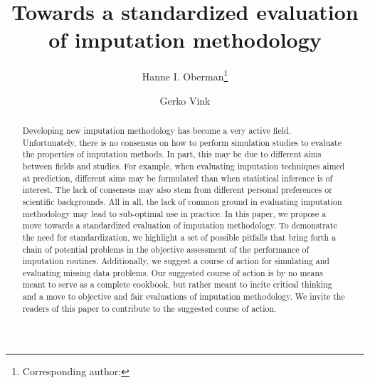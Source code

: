 \documentclass[bimj,fleqn]{w-art}
\begin{document}
\keywords{Evaluation; Imputation; Missing data; Simulation studies;\\ [1pc]
\noindent \hspace*{-4pc} Supporting Information for this article is available from \underline{www.gerkovink.com/evaluation}.\\
}  %

\title[Towards a standardized evaluation of imputation methodology]{Towards a standardized evaluation of imputation methodology}
\author[Oberman]{Hanne I. Oberman\footnote{Corresponding author: {}}} 
\address[\inst{1}]{Departement of Methodology \& Statistics, Padualaan 14, 3584 CH Utrecht, The Netherlands}
\author[Vink]{Gerko Vink}
   

\begin{abstract}
Developing new imputation methodology has become a very active field. Unfortunately, there is no consensus on how to perform simulation studies to evaluate the properties of imputation methods. In part, this may be due to different aims between fields and studies. For example, when evaluating imputation techniques aimed at prediction, different aims may be formulated than when statistical inference is of interest. The lack of consensus may also stem from different personal preferences or scientific backgrounds. All in all, the lack of common ground in evaluating imputation methodology may lead to sub-optimal use in practice. In this paper, we propose a move towards a standardized evaluation of imputation methodology. To demonstrate the need for standardization, we highlight a set of possible pitfalls that bring forth a chain of potential problems in the objective assessment of the performance of imputation routines.  Additionally, we suggest a course of action for simulating and evaluating missing data problems. Our suggested course of action is by no means meant to serve as a complete cookbook, but rather meant to incite critical thinking and a move to objective and fair evaluations of imputation methodology. We invite the readers of this paper to contribute to the suggested course of action.
\end{abstract}
\end{document}
